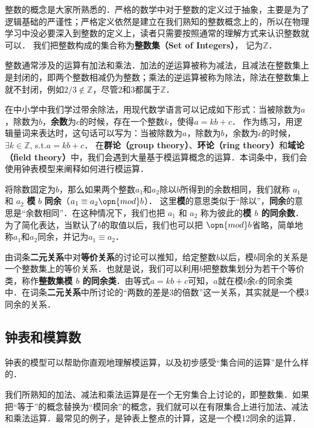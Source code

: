 
整数的概念是大家所熟悉的．严格的数学中对于整数的定义过于抽象，主要是为了逻辑基础的严谨性；严格定义依然是建立在我们熟知的整数概念上的，所以在物理学习中没必要深入到整数的定义上，读者只需要按照通常的理解方式来认识整数就可以． 我们把整数构成的集合称为\textbf{整数集（Set of Integers）}， 记为$\mathbb{Z}$．

整数通常涉及的运算有加法和乘法．加法的逆运算被称为减法，且减法在整数集上是封闭的，即两个整数相减仍为整数；乘法的逆运算被称为除法，除法在整数集上就不封闭，例如$2/3\not\in\mathbb{Z}$，尽管$2$和$3$都属于$\mathbb{Z}$．

在中小学中我们学过带余除法，用现代数学语言可以记成如下形式：当被除数为$a$，除数为$b$，\textbf{余数}为$c$的时候，存在一个整数$k$，使得$a=kb+c$． 作为练习，用逻辑量词来表达时，这句话可以写为：当被除数为$a$，除数为$b$，余数为$c$的时候，$\exists k\in \mathbb{Z}$, s.t.$ a=kb+c$． 在\textbf{群论（group theory）}、\textbf{环论（ring theory）}和\textbf{域论（field theory）}中，我们会遇到大量基于模运算概念的运算．本词条中，我们会使用钟表模型来阐释如何进行模运算．

将除数固定为$b$，那么如果两个整数$a_1$和$a_2$除以$b$所得到的余数相同，我们就称 $a_1$ 和 $a_2$ \textbf{模} $b$ \textbf{同余}（$a_1\equiv a_2 \opn{mod} b$）． 这里\textbf{模}的意思类似于“除以”，\textbf{同余}的意思是“余数相同”．在这种情况下，我们也把 $a_1$ 和 $a_2$ 称为彼此的\textbf{模 $b$ 的同余数}． 为了简化表达，当默认了$b$的取值以后，我们也可以把 $\opn{mod} b$省略，简单地称$a_1$和$a_2$同余，并记为$a_1\equiv a_2$． 

由词条\textbf{二元关系}中对\textbf{等价关系}的讨论可以推知，给定整数$b$以后，模$b$同余的关系是一个整数集上的等价关系．也就是说，我们可以利用$b$把整数集划分为若干个等价类，称作\textbf{整数集模 $b$ 的同余类}．由等式$a=kb+c$可知，$a$就在模$b$余$c$的同余类中．在词条\textbf{二元关系}中所讨论的“两数的差是3的倍数”这一关系，其实就是一个模3同余的关系．

\subsection{钟表和模算数}

钟表的模型可以帮助你直观地理解模运算，以及初步感受“集合间的运算”是什么样的．

我们所熟知的加法、减法和乘法运算是在一个无穷集合上讨论的，即整数集．如果把“等于”的概念替换为“模同余”的概念，我们就可以在有限集合上进行加法、减法和乘法运算．最常见的例子，是钟表上整点的计算，这是一个模12同余的运算．

